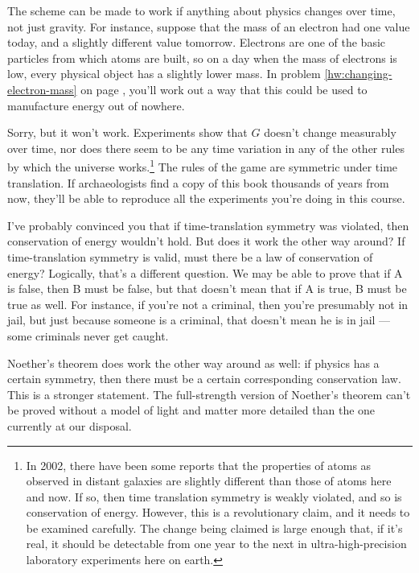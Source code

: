 The scheme can be made to work if anything about physics changes over time, not
just gravity. For instance, suppose that the mass of an electron had one value
today, and a slightly different value tomorrow. Electrons are one of the basic
particles from which atoms are built, so on a day when the mass of electrons is low, every
physical object has a slightly lower mass. In problem \ref{hw:changing-electron-mass}
on page \pageref{hw:changing-electron-mass}, you'll work out a way that this could
be used to manufacture energy out of nowhere.\label{text:changing-electron-mass}

Sorry, but it won't work. Experiments show that $G$ doesn't change measurably over
time, nor does there seem to be any time variation in any of the other rules by which the universe
works.\footnote{In 2002, there have been some reports that the properties of atoms
as observed in distant galaxies are slightly different than those of atoms here and
now. If so, then time translation symmetry is weakly violated, and so is conservation
of energy. However, this is a revolutionary claim, and it needs to be examined carefully.
The change being claimed is large enough that, if it's real, it should be detectable
from one year to the next in ultra-high-precision laboratory experiments here on earth.}
The rules of the game are symmetric under time translation. If archaeologists find a
copy of this book thousands of years from now, they'll be able to reproduce all the
experiments you're doing in this course.

I've probably convinced you that if time-translation symmetry was violated, then
conservation of energy wouldn't hold. But does it work the other way around? If time-translation
symmetry is valid, must there be a law of conservation of energy? 
Logically, that's a different question. We may be able to
prove that if A is false, then B must be false, but that doesn't mean that if A is
true, B must be true as well.
For instance, if you're not a criminal, then you're presumably not in jail, but just
because someone is a criminal, that doesn't mean he is in jail
--- some criminals never get caught.

Noether's theorem does work the other way around as well: if physics has a certain
symmetry, then there must be a certain corresponding conservation law. This is
a stronger statement. The full-strength version of Noether's theorem can't
be proved without a  model of light and matter more detailed than the one
currently at our disposal.

